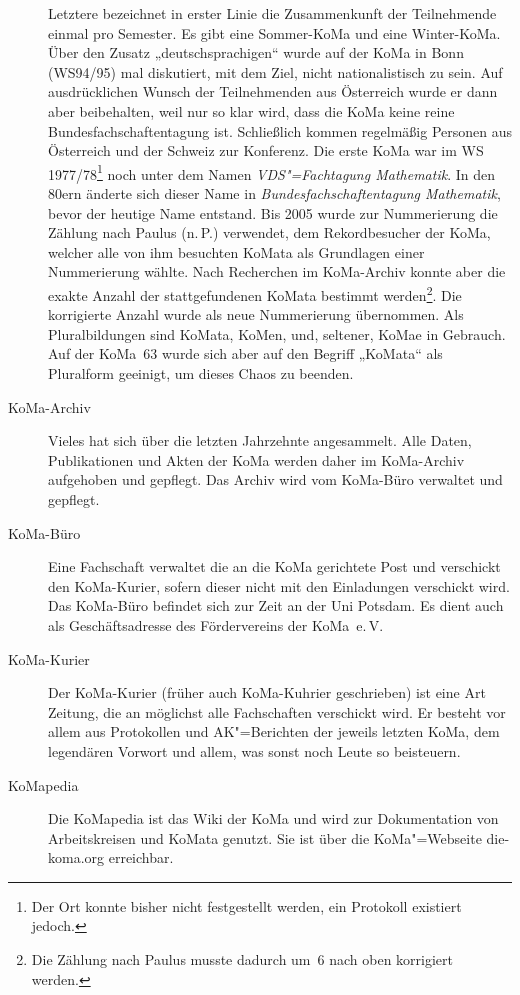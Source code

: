 \begin{description}
	Letztere bezeichnet in erster Linie die Zusammenkunft der Teilnehmende einmal pro Semester. Es gibt eine Sommer-KoMa und eine Winter-KoMa. Über den Zusatz „deutschsprachigen“ wurde auf der KoMa in Bonn (WS94/95) mal diskutiert, mit dem Ziel, nicht nationalistisch zu sein. Auf ausdrücklichen Wunsch der Teilnehmenden aus Österreich wurde er dann aber beibehalten, weil nur so klar wird, dass die KoMa keine reine Bundesfachschaftentagung ist. Schließlich kommen regelmäßig Personen aus Österreich und der Schweiz zur Konferenz. Die erste KoMa war im WS 1977/78\footnote{Der Ort konnte bisher nicht festgestellt werden, ein Protokoll existiert jedoch.} noch unter dem Namen \emph{VDS"=Fachtagung Mathematik}. In den 80ern änderte sich dieser Name in \emph{Bundesfachschaftentagung Mathematik}, bevor der heutige Name entstand.  Bis 2005 wurde zur Nummerierung die Zählung nach Paulus (n.\,P.) verwendet, dem Rekordbesucher der KoMa, welcher alle von ihm besuchten KoMata als Grundlagen einer Nummerierung wählte. Nach Recherchen im KoMa-Archiv konnte aber die exakte Anzahl der stattgefundenen KoMata bestimmt werden\footnote{Die Zählung nach Paulus musste dadurch um~6 nach oben korrigiert werden.}. Die korrigierte Anzahl wurde als neue Nummerierung übernommen. Als Pluralbildungen sind KoMata, KoMen, und, seltener, KoMae in Gebrauch. Auf der KoMa~63 wurde sich aber auf den Begriff „KoMata“ als Pluralform geeinigt, um dieses Chaos zu beenden.

\item[KoMa-Archiv]
    Vieles hat sich über die letzten Jahrzehnte angesammelt. Alle Daten, Publikationen und Akten der 	KoMa werden daher im KoMa-Archiv aufgehoben und gepflegt. Das Archiv wird vom KoMa-Büro verwaltet 	und gepflegt.

\item[KoMa-Büro]
    Eine Fachschaft verwaltet die an die KoMa gerichtete Post und verschickt den KoMa-Kurier, sofern dieser nicht mit den Einladungen verschickt wird. Das KoMa-Büro befindet sich zur Zeit an der Uni Potsdam. Es dient auch als Geschäftsadresse des Fördervereins der KoMa~e.\,V.

\item[KoMa-Kurier]
    Der KoMa-Kurier (früher auch KoMa-Kuhrier geschrieben) ist eine Art Zeitung, die an möglichst alle Fachschaften verschickt wird. Er besteht vor allem aus Protokollen und AK"=Berichten der jeweils letzten KoMa, dem legendären Vorwort und allem, was sonst noch Leute so beisteuern.

\item[KoMapedia]
    Die KoMapedia ist das Wiki der KoMa und wird zur Dokumentation von Arbeitskreisen und KoMata genutzt. Sie ist über die KoMa"=Webseite	die-koma.org erreichbar.


\end{description}
